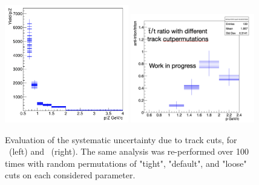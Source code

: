 \begin{figure}
    \centering
    \includegraphics[width=0.48\textwidth]{figures/he3_tracking_systematics.png}
    \includegraphics[width=0.48\textwidth]{figures/triton/Systematics_2.png}
    \caption{Evaluation of the systematic uncertainty due to track cuts, for \ahe\ (left) and \atrit\ (right). The same analysis was re-performed over 100 times with random permutations of "tight", "default", and "loose" cuts on each considered parameter.}
    \label{fig:TrackingSystematics}
\end{figure}

